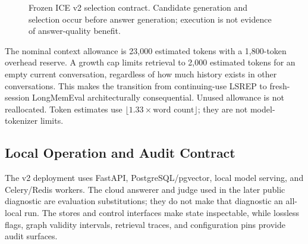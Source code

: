 \documentclass[11pt,a4paper]{article}
\begin{document}
\begin{figure}[htbp]
\centering{}
\caption{Frozen ICE v2 selection contract. Candidate generation and selection occur before answer generation; execution is not evidence of answer-quality benefit.}
\label{fig:retrieval-algorithm}
\end{figure}

The nominal context allowance is 23,000 estimated tokens with a 1,800-token overhead reserve. A growth cap limits retrieval to 2,000 estimated tokens for an empty current conversation, regardless of how much history exists in other conversations. This makes the transition from continuing-use LSREP to fresh-session LongMemEval architecturally consequential. Unused allowance is not reallocated. Token estimates use $\lfloor1.33\times\text{word count}\rfloor$; they are not model-tokenizer limits.

\subsection{Local Operation and Audit Contract}
The v2 deployment uses FastAPI, PostgreSQL/pgvector, local model serving, and Celery/Redis workers. The cloud answerer and judge used in the later public diagnostic are evaluation substitutions; they do not make that diagnostic an all-local run. The stores and control interfaces make state inspectable, while lossless flags, graph validity intervals, retrieval traces, and configuration pins provide audit surfaces.
\end{document}
